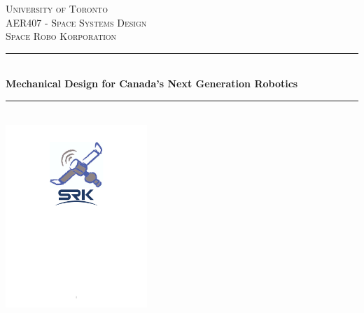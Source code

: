 \newcommand{\HRule}{\rule{\linewidth}{0.5mm}} %
\begin{titlepage}


\center %
 

\textsc{\LARGE University of Toronto}\\[1.2cm] %
\textsc{\Large AER407 - Space Systems Design}\\[0.5cm] %
\textsc{\large Space Robo Korporation}\\[0.5cm] %


\HRule \\[0.4cm]
{ \huge \bfseries Mechanical Design for Canada's Next Generation Robotics}\\[0.5cm] %
\HRule \\[1.2cm]


\includegraphics[width=0.4\textwidth]{logo}\\[1cm] 




\end{titlepage}
